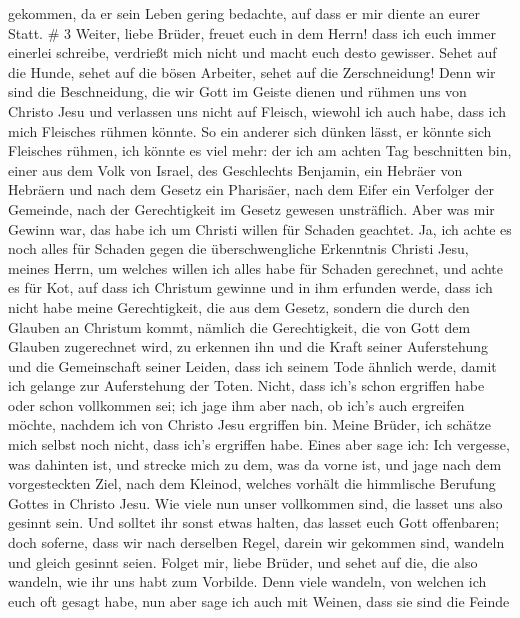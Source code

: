 gekommen, da er sein Leben gering bedachte, auf dass er mir diente an
eurer Statt. \# 3  Weiter, liebe Brüder, freuet euch in dem
Herrn! dass ich euch immer einerlei schreibe, verdrießt mich nicht und
macht euch desto gewisser.  Sehet auf die Hunde, sehet auf
die bösen Arbeiter, sehet auf die Zerschneidung!  Denn wir
sind die Beschneidung, die wir Gott im Geiste dienen und rühmen uns von
Christo Jesu und verlassen uns nicht auf Fleisch,  wiewohl
ich auch habe, dass ich mich Fleisches rühmen könnte. So ein anderer
sich dünken lässt, er könnte sich Fleisches rühmen, ich könnte es viel
mehr:  der ich am achten Tag beschnitten bin, einer aus dem
Volk von Israel, des Geschlechts Benjamin, ein Hebräer von Hebräern und
nach dem Gesetz ein Pharisäer,  nach dem Eifer ein Verfolger
der Gemeinde, nach der Gerechtigkeit im Gesetz gewesen unsträflich.
 Aber was mir Gewinn war, das habe ich um Christi willen für
Schaden geachtet.  Ja, ich achte es noch alles für Schaden
gegen die überschwengliche Erkenntnis Christi Jesu, meines Herrn, um
welches willen ich alles habe für Schaden gerechnet, und achte es für
Kot, auf dass ich Christum gewinne  und in ihm erfunden
werde, dass ich nicht habe meine Gerechtigkeit, die aus dem Gesetz,
sondern die durch den Glauben an Christum kommt, nämlich die
Gerechtigkeit, die von Gott dem Glauben zugerechnet wird, 
zu erkennen ihn und die Kraft seiner Auferstehung und die Gemeinschaft
seiner Leiden, dass ich seinem Tode ähnlich werde,  damit
ich gelange zur Auferstehung der Toten.  Nicht, dass ich's
schon ergriffen habe oder schon vollkommen sei; ich jage ihm aber nach,
ob ich's auch ergreifen möchte, nachdem ich von Christo Jesu ergriffen
bin.  Meine Brüder, ich schätze mich selbst noch nicht,
dass ich's ergriffen habe. Eines aber sage ich: Ich vergesse, was
dahinten ist, und strecke mich zu dem, was da vorne ist, 
und jage nach dem vorgesteckten Ziel, nach dem Kleinod, welches vorhält
die himmlische Berufung Gottes in Christo Jesu.  Wie viele
nun unser vollkommen sind, die lasset uns also gesinnt sein. Und solltet
ihr sonst etwas halten, das lasset euch Gott offenbaren; 
doch soferne, dass wir nach derselben Regel, darein wir gekommen sind,
wandeln und gleich gesinnt seien.  Folget mir, liebe
Brüder, und sehet auf die, die also wandeln, wie ihr uns habt zum
Vorbilde.  Denn viele wandeln, von welchen ich euch oft
gesagt habe, nun aber sage ich auch mit Weinen, dass sie sind die Feinde
